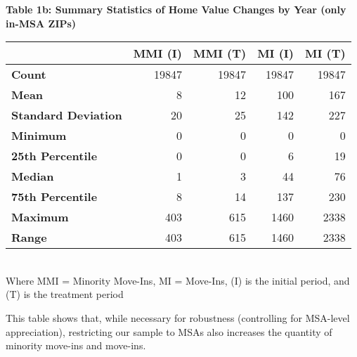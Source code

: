 \documentclass[11pt]{article}
\begin{document}
\begin{table}[H]
    \centering
    \textbf{Table 1b: Summary Statistics of Home Value Changes by Year (only in-MSA ZIPs)}
    \begin{tabular}{l|rrrr}
    \toprule
    & \textbf{MMI (I)} & \textbf{MMI (T)} & \textbf{MI (I)} & \textbf{MI (T)} \\
    \midrule
    \textbf{Count} & 19847 & 19847 & 19847 & 19847 \\
    \textbf{Mean} & 8 & 12 & 100 & 167 \\
    \textbf{Standard Deviation} & 20 & 25 & 142 & 227 \\
    \textbf{Minimum} & 0 & 0 & 0 & 0 \\
    \textbf{25th Percentile} & 0 & 0 & 6 & 19 \\
    \textbf{Median} & 1 & 3 & 44 & 76 \\
    \textbf{75th Percentile} & 8 & 14 & 137 & 230 \\
    \textbf{Maximum} & 403 & 615 & 1460 & 2338 \\
    \textbf{Range} & 403 & 615 & 1460 & 2338 \\
    \bottomrule
    \end{tabular}\\
    Where MMI = Minority Move-Ins, MI = Move-Ins, (I) is the initial period, and (T) is the treatment period
\end{table}
    This table shows that, while necessary for robustness (controlling for MSA-level appreciation), restricting our sample to MSAs also increases the quantity of minority move-ins and move-ins.
\end{document}

